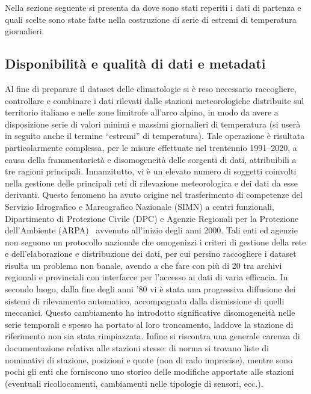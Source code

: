 
Nella sezione seguente si presenta da dove sono stati reperiti i dati di partenza e quali scelte sono state fatte nella costruzione di serie di estremi di temperatura giornalieri.

\subsection{Disponibilità e qualità di dati e metadati}
Al fine di preparare il dataset delle climatologie si è reso necessario raccogliere, controllare e combinare i dati rilevati dalle stazioni meteorologiche distribuite sul territorio italiano e nelle zone limitrofe all'arco alpino, in modo da avere a disposizione serie di valori minimi e massimi giornalieri di temperatura (si userà in seguito anche il termine ``estremi'' di temperatura). Tale operazione è risultata particolarmente complessa, per le misure effettuate nel trentennio 1991--2020, a causa della frammentarietà e disomogeneità delle sorgenti di dati, attribuibili a tre ragioni principali. Innanzitutto, vi è un elevato numero di soggetti coinvolti nella gestione delle principali reti di rilevazione meteorologica e dei dati da esse derivanti. Questo fenomeno ha avuto origine nel trasferimento di competenze del Servizio Idrografico e Mareografico Nazionale (SIMN) a centri funzionali, Dipartimento di Protezione Civile (DPC) e Agenzie Regionali per la Protezione dell'Ambiente (ARPA)~\cite{InquadramentoStoricoMonitoraggio} avvenuto all'inizio degli anni 2000. Tali enti ed agenzie non seguono un protocollo nazionale che omogenizzi i criteri di gestione della rete e dell'elaborazione e distribuzione dei dati, per cui persino raccogliere i dataset risulta un problema non banale, avendo a che fare con più di 20 tra archivi regionali e provinciali con interfacce per l'accesso ai dati di varia efficacia. In secondo luogo, dalla fine degli anni '80 vi è stata una progressiva diffusione dei sistemi di rilevamento automatico, accompagnata dalla dismissione di quelli meccanici. Questo cambiamento ha introdotto significative disomogeneità nelle serie temporali e spesso ha portato al loro troncamento, laddove la stazione di riferimento non sia stata rimpiazzata. Infine si riscontra una generale carenza di documentazione relativa alle stazioni stesse: di norma si trovano liste di nominativi di stazione, posizioni e quote (non di rado imprecise), mentre sono pochi gli enti che forniscono uno storico delle modifiche apportate alle stazioni (eventuali ricollocamenti, cambiamenti nelle tipologie di sensori, ecc.).

